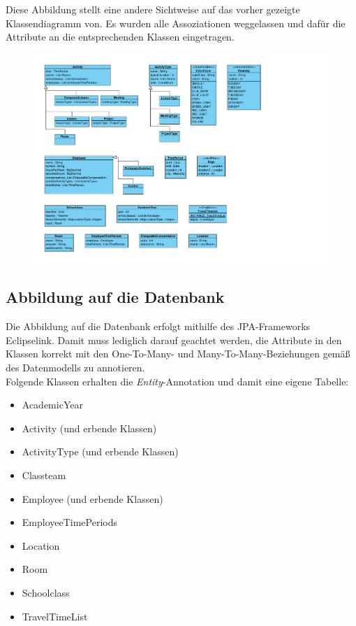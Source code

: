 \documentclass[fontsize=12pt,paper=a4,twoside]{scrartcl}
\begin{document}
Diese Abbildung stellt eine andere Sichtweise auf das vorher gezeigte Klassendiagramm von. Es wurden alle Assoziationen weggelassen und dafür die Attribute an die entsprechenden Klassen eingetragen.
\begin{figure}[H]
\includegraphics[width=\textwidth]{Datensicht.pdf}
\end{figure}


\subsection{Abbildung auf die Datenbank}
Die Abbildung auf die Datenbank erfolgt mithilfe des JPA-Frameworks Eclipselink. Damit muss lediglich darauf geachtet werden, die Attribute in den Klassen korrekt mit den One-To-Many- und Many-To-Many-Beziehungen gemäß des Datenmodells zu annotieren.\\

Folgende Klassen erhalten die \textit{Entity}-Annotation und damit eine eigene Tabelle: 
\begin{itemize}
\item AcademicYear
\item Activity (und erbende Klassen)
\item ActivityType (und erbende Klassen)
\item Classteam
\item Employee (und erbende Klassen)
\item EmployeeTimePeriods
\item Location
\item Room
\item Schoolclass
\item TravelTimeList
\end{itemize}
\end{document}
